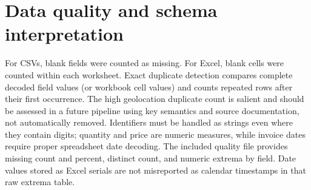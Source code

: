 \documentclass[11pt,a4paper]{article}
\begin{document}
\section{Data quality and schema interpretation}
For CSVs, blank fields were counted as missing. For Excel, blank cells were counted within each worksheet. Exact duplicate detection compares complete decoded field values (or workbook cell values) and counts repeated rows after their first occurrence. The high geolocation duplicate count is salient and should be assessed in a future pipeline using key semantics and source documentation, not automatically removed. Identifiers must be handled as strings even where they contain digits; quantity and price are numeric measures, while invoice dates require proper spreadsheet date decoding. The included quality file provides missing count and percent, distinct count, and numeric extrema by field. Date values stored as Excel serials are not misreported as calendar timestamps in that raw extrema table.
\end{document}

